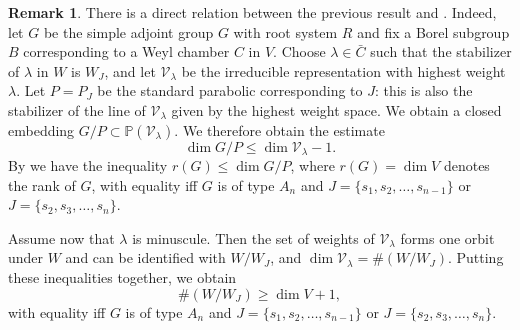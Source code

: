 \documentclass[reqno, 10pt]{amsart}
\newcommand{\BP}{\ensuremath{\mathbb {P}}\xspace}
\newcommand{\CV}{\ensuremath{\mathcal {V}}\xspace}
\theoremstyle{definition}
\newtheorem{remark}[subsubsection]{Remark}
\numberwithin{equation}{subsection}
\numberwithin{subsubsection}{subsection}
\begin{document}
\begin{remark}  There is a direct relation between the previous result and \cite[Prop. 1.4]{OR}. Indeed, let  $G$ be the simple adjoint group $G$ with root system $R$ and fix a Borel subgroup $B$ corresponding to a Weyl chamber $C$ in $V$. Choose $\lambda\in \bar C$  such that the stabilizer of $\lambda$ in $W$ is $W_J$, and let $\CV_{\lambda}$ be the irreducible representation with highest weight $\lambda$.
 Let $P=P_J$ be the standard parabolic corresponding to $J$: this is also the stabilizer of the line of $\CV_\lambda$ given by the highest weight space. We obtain a closed embedding $G/P\subset \BP(\CV_\lambda)$. We therefore obtain the estimate
$$
\dim G/P\leq \dim \CV_\lambda-1. 
$$
By \cite[Prop. 1.4]{OR} we have the inequality $r(G)\leq \dim G/P$, where $r(G)=\dim V$ denotes the rank of $G$, with equality iff $G$ is of type $A_n$ and $J=\{s_1, s_2,\ldots, s_{n-1}\}$ or $J=\{s_2, s_3,\ldots, s_{n}\}$. 

Assume now that $\lambda$ is minuscule. 
Then the set of weights of $\CV_\lambda$ forms one orbit under $W$ and can be identified with $W/W_J$, and $\dim \CV_\lambda=\# (W/W_J)$.
  Putting these inequalities together, we obtain 
$$
\# (W/W_J)\geq \dim V+1,
$$
with equality iff $G$ is of type $A_n$ and $J=\{s_1, s_2,\ldots, s_{n-1}\}$ or $J=\{s_2, s_3,\ldots, s_{n}\}$. 
\end{remark}
\end{document}
